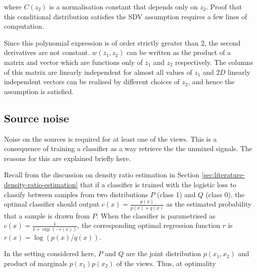 where $C(z_2)$ is a normalisation constant that depends only on $z_2$.
Proof that this conditional distribution satisfies the SDV assumption requires a few lines of computation.

Since this polynomial expression is of order strictly greater than 2, the second derivatives are not constant.
${w}(z_1, z_2)$ can be written as the product of a matrix and vector which are functions only of $z_1$ and $z_2$ respectively.
The columns of this matrix are linearly independent for almost all values of $z_1$ and $2D$ linearly independent vectors can be realised by different choices of $z_2$, and hence the assumption is satisfied.


\subsection{Source noise}\label{sec:converged}

Noise on the sources is required for at least one of the views. 
This is a consequence of training a classifier as a way retrieve the the unmixed signals.
The reasons for this are explained briefly here.

Recall from the discussion on density ratio estimation in Section \ref{sec:literature-density-ratio-estimation} that if a classifier is trained with the logistic loss to classify between samples from two distributions $P$ (class 1) and $Q$ (class 0), the optimal classifier should output $c(x) = \frac{p(x)}{p(x) + q(x)}$ as the estimated probability that a sample is drawn from $P$.
When the classifier is parametrised as $c(x) = \frac{1}{1 + \exp(-r(x))}$, the corresponding optimal regression function $r$ is $r(x) = \log( p(x) / q(x))$. 

In the setting considered here, $P$ and $Q$ are the joint distribution $p(x_1, x_2)$ and product of marginals $p(x_1)p(x_2)$ of the views.
Thus, at optimality




